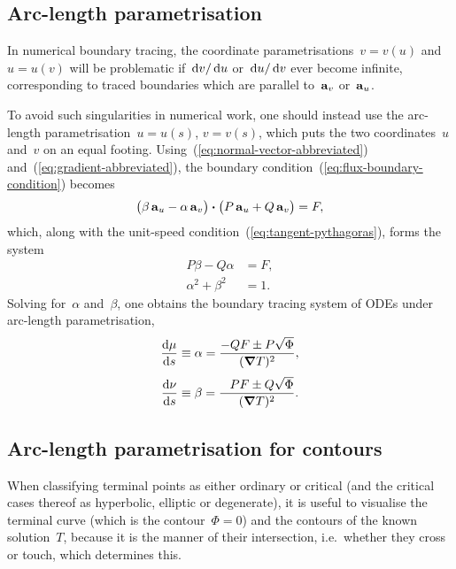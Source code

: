 \subsection{Arc-length parametrisation}
\label{sec:curvilinear.tracing.arc-length}

In numerical boundary tracing,
the coordinate parametrisations~$v = v (u)$ and~$u = u (v)$
will be problematic
if~$\td v / \td u$ or~$\td u / \td v$ ever become infinite,
corresponding to traced boundaries
which are parallel to~$\basisvec{v}$ or~$\basisvec{u}$.

To avoid such singularities in numerical work, one should instead use
the arc-length parametrisation~$u = u (s)$, $v = v(s)$,
which puts the two coordinates~$u$ and~$v$ on an equal footing.
Using~(\ref{eq:normal-vector-abbreviated})
and~(\ref{eq:gradient-abbreviated}),
the boundary condition~(\ref{eq:flux-boundary-condition}) becomes
\[
  \roundbr[\big]{\beta \basisvec{u} - \alpha \basisvec{v}}
    \dotp
  \roundbr[\big]{P \basisvec{u} + Q \basisvec{v}}
    =
  F,
\]
which, along with the unit-speed condition~(\ref{eq:tangent-pythagoras}),
forms the system
\begin{align}
  P \beta - Q \alpha &= F,
    \label{eq:tracing-arc-length-parametrisation-flux-boundary-condition} \\
  \alpha^2 + \beta^2 &= 1.
    \label{eq:tracing-arc-length-parametrisation-unit-speed}
\end{align}
Solving for~$\alpha$ and~$\beta$, one obtains
the boundary tracing system of ODEs under arc-length parametrisation,
\begin{align}
  \tder{\mu}{s} &\defeq \alpha = \frac{-Q F \pm P \sqrt{\Phi}}{(\del T)^2},
    \label{eq:tracing-ode-arc-length-parametrisation-mu} \\[\fraclinespace]
  \tder{\nu}{s} &\defeq \beta = \frac{\+P F \pm Q \sqrt{\Phi}}{(\del T)^2}.
    \label{eq:tracing-ode-arc-length-parametrisation-nu}
\end{align}

\subsection{Arc-length parametrisation for contours}
\label{sec:curvilinear.tracing.arc-length-contours}

When classifying terminal points as either ordinary or critical
(and the critical cases thereof as hyperbolic, elliptic or degenerate),
it is useful to visualise the terminal curve (which is the contour~$\Phi = 0$)
and the contours of the known solution~$T$,
because it is the manner of their intersection,
i.e.~whether they cross or touch,
which determines this.

